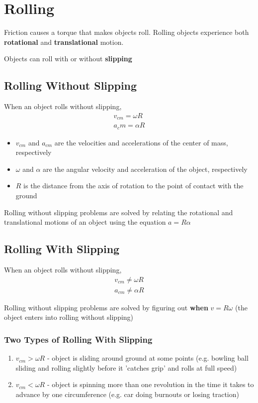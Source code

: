 \documentclass[titlepage]{article}
\begin{document}
\section{Rolling}
Friction causes a torque that makes objects roll. Rolling objects experience both \textbf{rotational} and \textbf{translational} motion.

Objects can roll with or without \textbf{slipping}

\subsection{Rolling Without Slipping}
When an object rolls without slipping,
\begin{align*}
    v_{cm} = \omega R \\
    a_cm = \alpha R
\end{align*}

\begin{itemize}
    \item $v_{cm}$ and $a_{cm}$ are the velocities and accelerations of the center of mass, respectively
    \item $\omega$ and $\alpha$ are the angular velocity and acceleration of the object, respectively
    \item $R$ is the distance from the axis of rotation to the point of contact with the ground
\end{itemize}

Rolling without slipping problems are solved by relating the rotational and translational motions of an object using the equation $a = R\alpha$

\subsection{Rolling With Slipping}
When an object rolls without slipping,
\begin{align*}
    v_{cm} \neq \omega R \\
    a_{cm} \neq \alpha R
\end{align*}

Rolling without slipping problems are solved by figuring out \textbf{when} $v = R \omega$ (the object enters into rolling without slipping)

\subsubsection{Two Types of Rolling With Slipping}
\begin{enumerate}
    \item $v_{cm} > \omega R$ - object is sliding around ground at some points (e.g. bowling ball sliding and rolling slightly before it 'catches grip' and rolls at full speed)
    \item $v_{cm} < \omega R$ - object is spinning more than one revolution in the time it takes to advance by one circumference (e.g. car doing burnouts or losing traction)
\end{enumerate}
\end{document}
